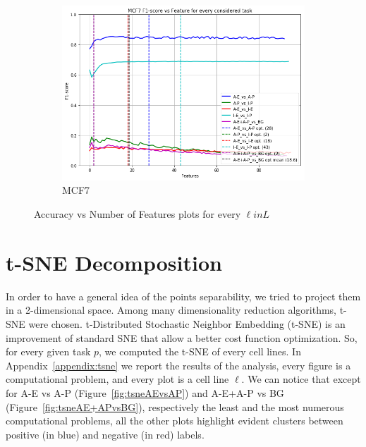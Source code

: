 \begin{figure}[!htb]
    \begin{subfigure}[b]{0.48\textwidth}
        \includegraphics[width=\textwidth]{images/features_plots/MCF7_feature_plot.png}
        \caption{MCF7}
        \label{fig:MCF7_n_feat}
    \end{subfigure}
    \caption{Accuracy vs Number of Features plots for every $\ell in L$}\label{fig:feats_plot}
\end{figure}


\section{t-SNE Decomposition}
In order to have a general idea of the points separability, we tried to  project them in a 2-dimensional space. Among many dimensionality reduction algorithms, t-SNE were chosen. t-Distributed Stochastic Neighbor Embedding (t-SNE) \cite{vanDerMaaten2008} is an improvement of standard SNE \cite{HintonSNE} that allow a better cost function optimization. So, for every given task $p$, we  computed the t-SNE of every cell lines. 
In Appendix~\ref{appendix:tsne} we report the results of the analysis, every figure is a computational problem, and every plot is a cell line $\ell$. We can notice that except for A-E vs A-P (Figure~\ref{fig:tsneAEvsAP}) and A-E+A-P vs BG (Figure~\ref{fig:tsneAE+APvsBG}), respectively the least and the most numerous computational problems, all the other plots highlight evident clusters between positive (in blue) and negative (in red) labels. 